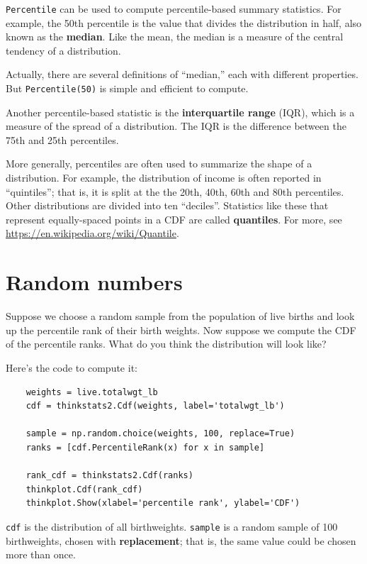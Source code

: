 \documentclass[12pt]{book}
\begin{document}
{\tt Percentile} can be used to compute percentile-based summary
statistics.  For example, the 50th percentile is the value that
divides the distribution in half, also known as the {\bf median}.
Like the mean, the median is a measure of the central tendency
of a distribution.

Actually, there are several definitions of ``median,'' each with
different properties.  But {\tt Percentile(50)} is simple and
efficient to compute.

Another percentile-based statistic is the {\bf interquartile range} (IQR),
which is a measure of the spread of a distribution.  The IQR
is the difference between the 75th and 25th percentiles.

More generally, percentiles are often used to summarize the shape
of a distribution.  For example, the distribution of income is
often reported in ``quintiles''; that is, it is split at the
the 20th, 40th, 60th and 80th percentiles.  Other distributions
are divided into ten ``deciles''.  Statistics like these that represent
equally-spaced points in a CDF are called {\bf quantiles}.
For more, see \url{https://en.wikipedia.org/wiki/Quantile}.


\section{Random numbers}
\label{random}

Suppose we choose a random sample from the population of live
births and look up the percentile rank of their birth weights.
Now suppose we compute the CDF of the percentile ranks.  What do
you think the distribution will look like?

Here's the code to compute it:

\begin{verbatim}
    weights = live.totalwgt_lb
    cdf = thinkstats2.Cdf(weights, label='totalwgt_lb')

    sample = np.random.choice(weights, 100, replace=True)
    ranks = [cdf.PercentileRank(x) for x in sample]

    rank_cdf = thinkstats2.Cdf(ranks)
    thinkplot.Cdf(rank_cdf)
    thinkplot.Show(xlabel='percentile rank', ylabel='CDF')
\end{verbatim}

{\tt cdf} is the distribution of all birthweights.  {\tt sample}
is a random sample of 100 birthweights, chosen with {\bf replacement};
that is, the same value could be chosen more than once.
\end{document}
